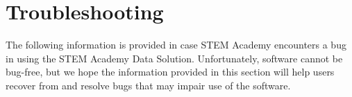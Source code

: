 \documentclass[letterpaper,10pt,serif, draftclsnofoot,onecolumn, compsoc, titlepage]{IEEEtran}
\begin{document}
\section{Troubleshooting}
The following information is provided in case STEM Academy encounters a bug in using the STEM Academy Data Solution.
Unfortunately, software cannot be bug-free, but we hope the information provided in this section will help users recover
 from and resolve bugs that may impair use of the software.
\end{document}

